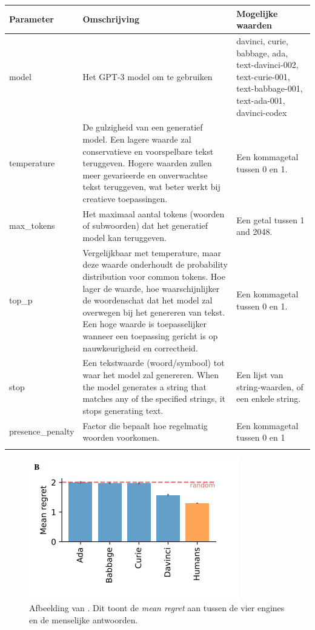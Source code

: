 	\begin{tabular}{ m{3cm} | m{3cm} | m{10cm} | }
	\hline
	Parameter & Omschrijving & Mogelijke waarden \\
	\hline
	model & Het GPT-3 model om te gebruiken & davinci, curie, babbage, ada, text-davinci-002, text-curie-001, text-babbage-001, text-ada-001, davinci-codex \\
	\hline
	temperature & De gulzigheid van een generatief model. Een lagere waarde zal conservatieve en voorspelbare tekst teruggeven. Hogere waarden zullen meer gevarieerde en onverwachtse tekst teruggeven, wat beter werkt bij creatieve toepassingen. & Een kommagetal tussen 0 en 1. \\
	\hline
	max\_tokens & Het maximaal aantal tokens (woorden of subwoorden) dat het generatief model kan teruggeven. & Een getal tussen 1 and 2048. \\
	\hline
	top\_p & Vergelijkbaar met temperature, maar deze waarde onderhoudt de probability distribution voor common tokens. Hoe lager de waarde, hoe waarschijnlijker de woordenschat dat het model zal overwegen bij het genereren van tekst. Een hoge waarde is toepasselijker wanneer een toepassing gericht is op nauwkeurigheid en correctheid. & Een kommagetal tussen 0 en 1. \\
	\hline
	stop & Een tekstwaarde (woord/symbool) tot waar het model zal genereren. When the model generates a string that matches any of the specified strings, it stops generating text. & Een lijst van string-waarden, of een enkele string. \\
	\hline
	presence\_penalty & Factor die bepaalt hoe regelmatig woorden voorkomen. & Een kommagetal tussen 0 en 1 \\
	\hline
	\caption{Tabel met alle GPT-3 parameters.}
	\label{table:gpt-3-parameters}
\end{tabular}

\begin{figure}
	\begin{center}
		\includegraphics{img/chatgpt-engines-mean-regret.png}
		\caption{Afbeelding van \textcite{Binz2023}. Dit toont de \textit{mean regret} aan tussen de vier engines en de menselijke antwoorden.}
	\end{center}
\end{figure}


